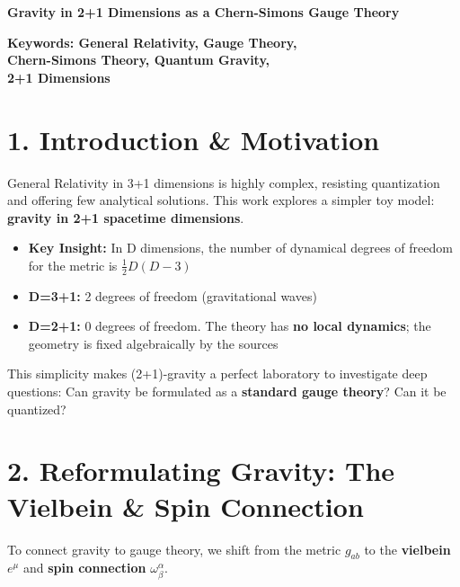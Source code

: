 \documentclass[a0,portrait]{a0poster}
\begin{document}
\begin{minipage}[b]{0.7\textwidth}
    \veryHuge\bfseries\color{blue1}
    Gravity in 2+1 Dimensions as a Chern-Simons Gauge Theory
\end{minipage}
\begin{minipage}[b]{0.28\textwidth}
    \Large\bfseries
    Keywords: General Relativity, Gauge Theory,\\ 
    Chern-Simons Theory, Quantum Gravity,\\
    2+1 Dimensions
\end{minipage}

\vspace{2cm}

\begin{multicols}{2}

\section*{1. Introduction \& Motivation}

General Relativity in 3+1 dimensions is highly complex, resisting quantization and offering few analytical solutions. This work explores a simpler toy model: \textbf{gravity in 2+1 spacetime dimensions}.

\begin{itemize}
    \item \textbf{Key Insight:} In D dimensions, the number of dynamical degrees of freedom for the metric is $\frac{1}{2}D(D-3)$
    \item \textbf{D=3+1:} 2 degrees of freedom (gravitational waves)
    \item \textbf{D=2+1:} 0 degrees of freedom. The theory has \textbf{no local dynamics}; the geometry is fixed algebraically by the sources
\end{itemize}

This simplicity makes (2+1)-gravity a perfect laboratory to investigate deep questions: Can gravity be formulated as a \textbf{standard gauge theory}? Can it be quantized?

\section*{2. Reformulating Gravity: The Vielbein \& Spin Connection}

To connect gravity to gauge theory, we shift from the metric $g_{ab}$ to the \textbf{vielbein} $e^\mu$ and \textbf{spin connection} $\omega^\alpha_\beta$.


\end{multicols}
\end{document}
